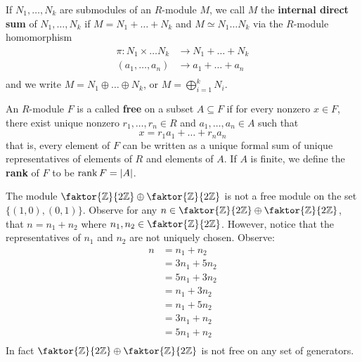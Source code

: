 \begin{definition}
  If $N_1, \dots, N_k$ are submodules of an $R$-module  $M$, we call
  $M$ the  \textbf{internal direct sum} of $N_1, \dots, N_k$ if
  $M=N_1+\dots+N_k$ and $M \simeq N_1 \dots N_k$ via the $R$-module
  homomorphism
  \begin{align*}
    \pi: N_1 \times \dots N_k & \xrightarrow{} N_1+\dots+N_k  \\
    (a_1, \dots, a_n)       & \xrightarrow{} a_1+\dots+a_n  \\
  \end{align*}
  and we write $M=N_1 \oplus \dots \oplus N_k$, or
  $M=\bigoplus_{i=1}^k{N_i}$.
\end{definition}

\begin{definition}
  An $R$-module  $F$ is a called \textbf{free} on a subset $A
  \subseteq F$ if for every nonzero $x \in F$, there exist unique
  nonzero $r_1, \dots, r_n \in R$ and $a_1, \dots, a_n \in A$ such
  that
  \begin{equation*}
    x=r_1a_1+\dots+r_na_n
  \end{equation*}
  that is, every element of $F$ can be written as a unique formal sum
  of unique representatives of elements of $R$ and elements of $A$. If
  $A$ is finite, we define the \textbf{rank} of $F$ to be
  $\operatorname{rank}{F}=|A|$.
\end{definition}

\begin{example}\label{example_4.5}
  The module $\faktor{\Z}{2\Z} \oplus \faktor{\Z}{2\Z}$ is not a free
  module on the set $\{(1,0), (0,1)\}$. Observe for any $n \in
  \faktor{\Z}{2\Z} \oplus \faktor{\Z}{2\Z}$, that $n=n_1+n_2$ where
  $n_1,n_2 \in \faktor{\Z}{2\Z}$. However, notice that the
  representatives of $n_1$ and $n_2$ are not uniquely chosen. Observe:
  \begin{align*}
    n &=  n_1+n_2 \\
      &=  3n_1+5n_2 \\
      &=  5n_1+3n_2 \\
      &=  n_1+3n_2 \\
      &=  n_1+5n_2 \\
      &=  3n_1+n_2 \\
      &=  5n_1+n_2 \\
  \end{align*}
  In fact $\faktor{\Z}{2\Z} \oplus \faktor{\Z}{2\Z}$ is not free on
  any set of generators.
\end{example}

